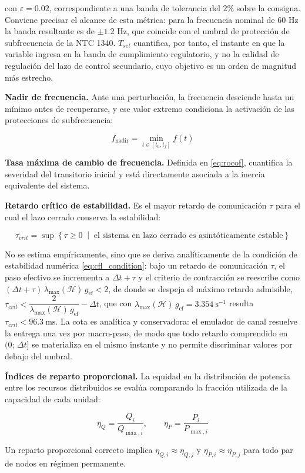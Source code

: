 con $\varepsilon = 0.02$, correspondiente a una banda de tolerancia del $2\%$ sobre la consigna. Conviene precisar el alcance de esta métrica: para la frecuencia nominal de $60\text{ Hz}$ la banda resultante es de $\pm 1.2\text{ Hz}$, que coincide con el umbral de protección de subfrecuencia de la NTC 1340. $T_{set}$ cuantifica, por tanto, el instante en que la variable ingresa en la banda de cumplimiento regulatorio, y no la calidad de regulación del lazo de control secundario, cuyo objetivo es un orden de magnitud más estrecho.

\textbf{Nadir de frecuencia.} Ante una perturbación, la frecuencia desciende hasta un mínimo antes de recuperarse, y ese valor extremo condiciona la activación de las protecciones de subfrecuencia:

\[
f_{\text{nadir}} = \min_{t \in [t_0, t_f]} f(t)
\]

\textbf{Tasa máxima de cambio de frecuencia.} Definida en \eqref{eq:rocof}, cuantifica la severidad del transitorio inicial y está directamente asociada a la inercia equivalente del sistema.

\textbf{Retardo crítico de estabilidad.} Es el mayor retardo de comunicación $\tau$ para el cual el lazo cerrado conserva la estabilidad:

\begin{equation}\label{eq:tau_crit}
\tau_{crit} = \sup\left\{ \tau \ge 0 \;\middle|\; \text{el sistema en lazo cerrado es asintóticamente estable} \right\}
\end{equation}

No se estima empíricamente, sino que se deriva analíticamente de la condición de estabilidad numérica \eqref{eq:cfl_condition}: bajo un retardo de comunicación $\tau$, el paso efectivo se incrementa a $\Delta t + \tau$ y el criterio de contracción se reescribe como $(\Delta t + \tau)\,\lambda_{\max}(\mathcal{H})\,g_{\text{ef}} < 2$, de donde se despeja el máximo retardo admisible, $\tau_{crit} < \dfrac{2}{\lambda_{\max}(\mathcal{H})\,g_{\text{ef}}} - \Delta t$, que con $\lambda_{\max}(\mathcal{H})\,g_{\text{ef}} = 3.354\ \text{s}^{-1}$ resulta $\tau_{crit} < 96.3\ \text{ms}$. La cota es analítica y conservadora: el emulador de canal resuelve la entrega una vez por macro-paso, de modo que todo retardo comprendido en $(0;\,\Delta t]$ se materializa en el mismo instante y no permite discriminar valores por debajo del umbral.

\textbf{Índices de reparto proporcional.} La equidad en la distribución de potencia entre los recursos distribuidos se evalúa comparando la fracción utilizada de la capacidad de cada unidad:

\begin{equation}\label{eq:share_index}
\eta_Q = \frac{Q_i}{Q_{\max,i}}, \qquad \eta_P = \frac{P_i}{P_{\max,i}}
\end{equation}

Un reparto proporcional correcto implica $\eta_{Q,i} \approx \eta_{Q,j}$ y $\eta_{P,i} \approx \eta_{P,j}$ para todo par de nodos en régimen permanente.
